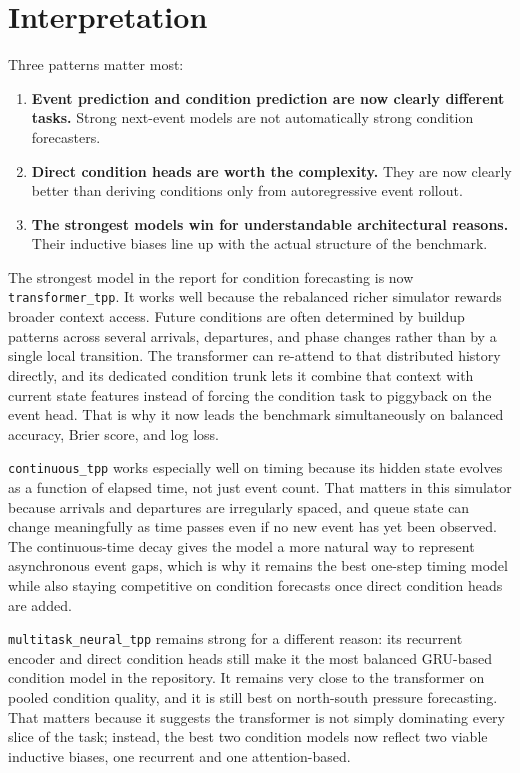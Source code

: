 \documentclass[11pt]{article}
\begin{document}
\section{Interpretation}

Three patterns matter most:

\begin{enumerate}
  \item \textbf{Event prediction and condition prediction are now clearly different tasks.}
  Strong next-event models are not automatically strong condition forecasters.

  \item \textbf{Direct condition heads are worth the complexity.}
  They are now clearly better than deriving conditions only from autoregressive event rollout.

  \item \textbf{The strongest models win for understandable architectural reasons.}
  Their inductive biases line up with the actual structure of the benchmark.
\end{enumerate}

The strongest model in the report for condition forecasting is now \texttt{transformer\_tpp}. It works well because the rebalanced richer simulator rewards broader context access. Future conditions are often determined by buildup patterns across several arrivals, departures, and phase changes rather than by a single local transition. The transformer can re-attend to that distributed history directly, and its dedicated condition trunk lets it combine that context with current state features instead of forcing the condition task to piggyback on the event head. That is why it now leads the benchmark simultaneously on balanced accuracy, Brier score, and log loss.

\texttt{continuous\_tpp} works especially well on timing because its hidden state evolves as a function of elapsed time, not just event count. That matters in this simulator because arrivals and departures are irregularly spaced, and queue state can change meaningfully as time passes even if no new event has yet been observed. The continuous-time decay gives the model a more natural way to represent asynchronous event gaps, which is why it remains the best one-step timing model while also staying competitive on condition forecasts once direct condition heads are added.

\texttt{multitask\_neural\_tpp} remains strong for a different reason: its recurrent encoder and direct condition heads still make it the most balanced GRU-based condition model in the repository. It remains very close to the transformer on pooled condition quality, and it is still best on north-south pressure forecasting. That matters because it suggests the transformer is not simply dominating every slice of the task; instead, the best two condition models now reflect two viable inductive biases, one recurrent and one attention-based.
\end{document}
